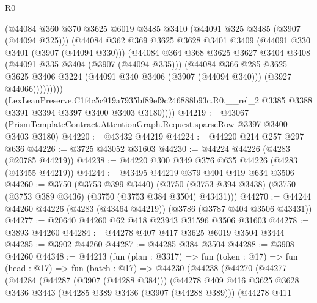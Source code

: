 \begin{lexlean}{R0}
\begin{coremodule}
                  (@44084
                    @360
                    @370
                    @3625
                    @6019
                    @3485
                    @3410
                    (@44091 @325 @3485 (@3907 (@44094 @325)))
                    (@44084
                      @362
                      @369
                      @3625
                      @3628
                      @3401
                      @3409
                      (@44091 @330 @3401 (@3907 (@44094 @330)))
                      (@44084
                        @364
                        @368
                        @3625
                        @3627
                        @3404
                        @3408
                        (@44091 @335 @3404 (@3907 (@44094 @335)))
                        (@44084
                          @366
                          @285
                          @3625
                          @3625
                          @3406
                          @3224
                          (@44091 @340 @3406 (@3907 (@44094 @340)))
                          (@3927 @44066)))))))))
          (LexLeanPreserve.C1f4c5c919a7935bf89ef9c246888b93c.R0.__rel_2
            @3385
            @3388
            @3391
            @3394
            @3397
            @3400
            @3403
            @3180))))
@44219 := @43067 (PrismTemplateContract.AttentionGraph.Request.sparseRow @3397 @3400 @3403 @3180)
@44220 := @43432 @44219
@44224 := @44220 @214 @257 @297 @636
@44226 := @3725 @43052 @31603
@44230 := @44224 @44226 (@4283 (@20785 @44219))
@44238 := @44220 @300 @349 @376 @635 @44226 (@4283 (@43455 @44219))
@44244 := @43495 @44219 @379 @404 @419 @634 @3506
@44260 := @3750
    (@3753 @399 @3440)
    (@3750 (@3753 @394 @3438) (@3750 (@3753 @389 @3436) (@3750 (@3753 @384 @3504) @43431)))
@44270 := @44244 @44260 @44226 (@4283 (@43464 @44219)) (@3786 (@3787 @404 @3506 @43431))
@44277 := @20640 @44260 @62 @418 @23943 @31596 @3506 @31603
@44278 := @3893 @44260
@44284 := @44278 @407 @417 @3625 @6019 @3504 @3444
@44285 := @3902 @44260
@44287 := @44285 @384 @3504
@44288 := @3908 @44260
@44348 := @44213
    (fun (plan : @3317) =>
    fun (token : @17) =>
    fun (head : @17) =>
    fun (batch : @17) =>
    @44230
      (@44238
        (@44270
          (@44277
            (@44284
              (@44287 (@3907 (@44288 @384)))
              (@44278
                @409
                @416
                @3625
                @3628
                @3436
                @3443
                (@44285 @389 @3436 (@3907 (@44288 @389)))
                (@44278
                  @411

\end{coremodule}
\end{lexlean}
